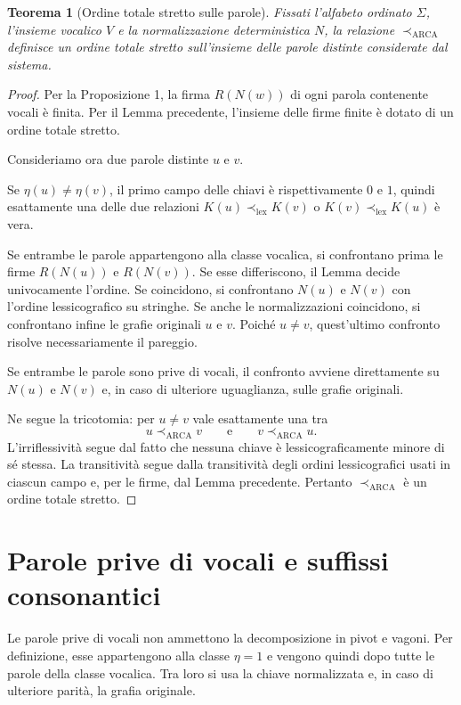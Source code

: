 \documentclass[11pt,a4paper]{article}
\newtheorem{teorema}{Teorema}
\theoremstyle{definition}
\theoremstyle{remark}
\newcommand{\ARCA}{\mathrm{ARCA}}
\newcommand{\precA}{\prec_{\ARCA}}
\newcommand{\lexord}{\prec_{\mathrm{lex}}}
\newcommand{\Nrm}{N}
\newcommand{\Sig}{R}
\newcommand{\Class}{\eta}
\begin{document}
\begin{teorema}[Ordine totale stretto sulle parole]
Fissati l'alfabeto ordinato $\Sigma$, l'insieme vocalico $V$ e la normalizzazione deterministica $\Nrm$, la relazione $\precA$ definisce un ordine totale stretto sull'insieme delle parole distinte considerate dal sistema.
\end{teorema}

\begin{proof}
Per la Proposizione 1, la firma $\Sig(\Nrm(w))$ di ogni parola contenente vocali è finita. Per il Lemma precedente, l'insieme delle firme finite è dotato di un ordine totale stretto.

Consideriamo ora due parole distinte $u$ e $v$.

Se $\Class(u)\neq\Class(v)$, il primo campo delle chiavi è rispettivamente $0$ e $1$, quindi esattamente una delle due relazioni $K(u)\lexord K(v)$ o $K(v)\lexord K(u)$ è vera.

Se entrambe le parole appartengono alla classe vocalica, si confrontano prima le firme $\Sig(\Nrm(u))$ e $\Sig(\Nrm(v))$. Se esse differiscono, il Lemma decide univocamente l'ordine. Se coincidono, si confrontano $\Nrm(u)$ e $\Nrm(v)$ con l'ordine lessicografico su stringhe. Se anche le normalizzazioni coincidono, si confrontano infine le grafie originali $u$ e $v$. Poiché $u\neq v$, quest'ultimo confronto risolve necessariamente il pareggio.

Se entrambe le parole sono prive di vocali, il confronto avviene direttamente su $\Nrm(u)$ e $\Nrm(v)$ e, in caso di ulteriore uguaglianza, sulle grafie originali.

Ne segue la tricotomia: per $u\neq v$ vale esattamente una tra
\[
  u\precA v
  \qquad\text{e}\qquad
  v\precA u.
\]
L'irriflessività segue dal fatto che nessuna chiave è lessicograficamente minore di sé stessa. La transitività segue dalla transitività degli ordini lessicografici usati in ciascun campo e, per le firme, dal Lemma precedente. Pertanto $\precA$ è un ordine totale stretto.
\end{proof}

\section{Parole prive di vocali e suffissi consonantici}

Le parole prive di vocali non ammettono la decomposizione in pivot e vagoni. Per definizione, esse appartengono alla classe $\Class=1$ e vengono quindi dopo tutte le parole della classe vocalica. Tra loro si usa la chiave normalizzata e, in caso di ulteriore parità, la grafia originale.
\end{document}
